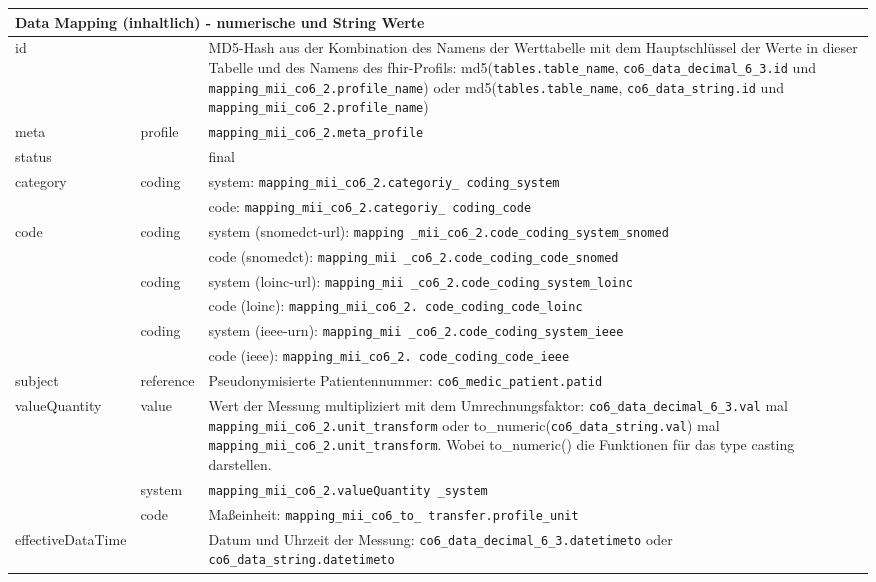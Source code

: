 \begin{longtable}{|l|l|p{7.5cm}|} 
	\hline
	\multicolumn{3}{|l|}{\bfseries Data Mapping (inhaltlich) - numerische und String Werte} \\ \hline
	id &  & MD5-Hash aus der Kombination des Namens der Werttabelle mit dem Hauptschlüssel der Werte in dieser Tabelle und des Namens des \ac{fhir}-Profils: md5(\texttt{tables.table\_name}, \texttt{co6\_data\_decimal\_6\_3.id} und \texttt{mapping\_mii\_co6\_2.profile\_name}) oder md5(\texttt{tables.table\_name}, \texttt{co6\_data\_string.id} und \texttt{mapping\_mii\_co6\_2.profile\_name}) \\ \hline
	meta & profile & \texttt{mapping\_mii\_co6\_2.meta\_profile} \\ \hline 
	status &  & final  \\ \hline 
	category & coding & system: \texttt{mapping\_mii\_co6\_2.categoriy\_ coding\_system} \\ 
	\cline{3-3}
	& & code: \texttt{mapping\_mii\_co6\_2.categoriy\_ coding\_code} \\ \hline
	code & coding & system (\ac{snomedct}-\acs{url}): \texttt{mapping \_mii\_co6\_2.code\_coding\_system\_snomed} \\ 
	\cline{3-3} 
	 &   & code (\ac{snomedct}): \texttt{mapping\_mii \_co6\_2.code\_coding\_code\_snomed} \\
	 \cline{2-3} 
	 &  coding & system (\ac{loinc}-\ac{url}): \texttt{mapping\_mii \_co6\_2.code\_coding\_system\_loinc} \\ 
	 \cline{3-3} 
	  &  & code (\ac{loinc}): \texttt{mapping\_mii\_co6\_2. code\_coding\_code\_loinc} \\ 
	 \cline{2-3} 
	  & coding & system (\ac{ieee}-\acs{urn}): \texttt{mapping\_mii \_co6\_2.code\_coding\_system\_ieee} \\ 
	 \cline{3-3} 
	 &  & code (\ac{ieee}): \texttt{mapping\_mii\_co6\_2. code\_coding\_code\_ieee} \\ \hline
	subject & reference & Pseudonymisierte Patientennummer: \texttt{co6\_medic\_patient.patid} \\ \hline
	valueQuantity & value & Wert der Messung multipliziert mit dem Umrechnungsfaktor: \texttt{co6\_data\_decimal\_6\_3.val} mal \texttt{mapping\_mii\_co6\_2.unit\_transform} oder to\_numeric(\texttt{co6\_data\_string.val}) mal \texttt{mapping\_mii\_co6\_2.unit\_transform}. Wobei to\_numeric() die Funktionen für das type casting darstellen.\\
	 \cline{2-3}
	 & system & \texttt{mapping\_mii\_co6\_2.valueQuantity \_system} \\ 
	 \cline{2-3}
	 & code & Maßeinheit: \texttt{mapping\_mii\_co6\_to\_ transfer.profile\_unit}\\ \hline
    effectiveDataTime & & Datum und Uhrzeit der Messung: \texttt{co6\_data\_decimal\_6\_3.datetimeto} oder \texttt{co6\_data\_string.datetimeto} \\  \hline
\end{longtable}

